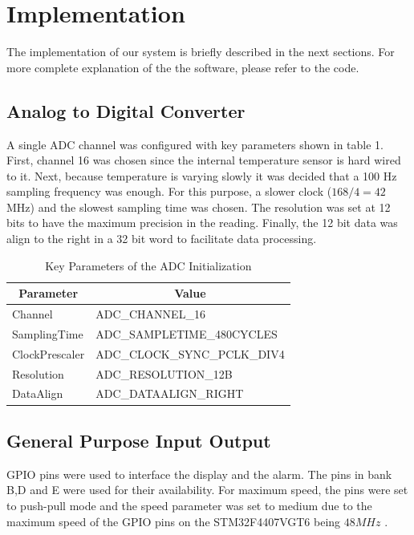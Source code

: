 \documentclass[12pt]{article}
\begin{document}
\section{Implementation}

The implementation of our system is briefly described in the next sections. For more complete explanation of the the software, please refer to the code. 
\subsection{Analog to Digital Converter}

A single ADC channel was configured with key parameters shown in table 1. First, channel 16 was chosen since the internal temperature sensor is hard wired to it. Next, because temperature is varying slowly it was decided that a 100 Hz sampling frequency was enough. For this purpose, a slower clock ($168/4 = 42$ MHz) and the slowest sampling time was chosen. The resolution was set at 12 bits to have the maximum precision in the reading. Finally, the 12 bit data was align to the right in a 32 bit word to facilitate data processing.
\begin{table}[H]
\centering
\caption{Key Parameters of the ADC Initialization}
\label{my-label}
\begin{tabular}{|l|l|}
\hline
\multicolumn{1}{|c|}{\textbf{Parameter}} & \multicolumn{1}{c|}{\textbf{Value}} \\ \hline
Channel                                  & ADC\_CHANNEL\_16                    \\ \hline
SamplingTime                             & ADC\_SAMPLETIME\_480CYCLES          \\ \hline
ClockPrescaler                           & ADC\_CLOCK\_SYNC\_PCLK\_DIV4        \\ \hline
Resolution                               & ADC\_RESOLUTION\_12B                \\ \hline
DataAlign                                & ADC\_DATAALIGN\_RIGHT               \\ \hline
\end{tabular}
\end{table}

\subsection{General Purpose Input Output}
\FloatBarrier
GPIO pins were used to interface the display and the alarm. The pins in bank B,D and E were used for their availability. For maximum speed, the pins were set to push-pull mode and the speed parameter was set to medium due to the maximum speed of the GPIO pins on the STM32F4407VGT6 being $48 MHz$ \cite{STM32F407xx}.
\end{document}
